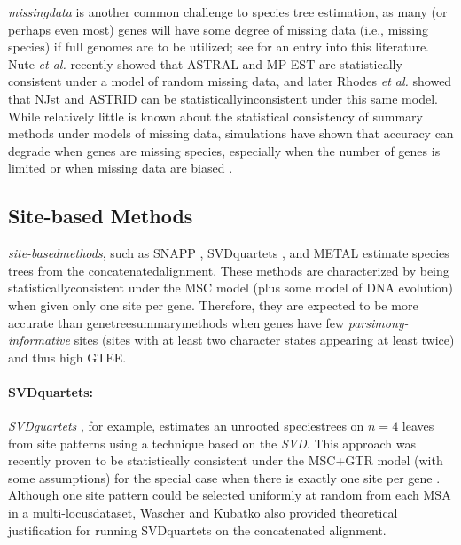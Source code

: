 \textit{\Gls{missingdata}} is another common challenge to species tree estimation, as many (or perhaps even most) \glspl{gene} will have some degree of missing data (i.e., missing species) if full genomes are to be utilized; see \cite{driskell2004prospects, streicher2016how, xi2016impact} for an entry into this literature.
Nute {\em et al.} \cite{nute2018performance} recently showed that ASTRAL and MP-EST are statistically consistent under a model of random missing data, and later Rhodes {\em et al.} \cite{rhodes2020njst} showed that NJst and ASTRID can be \gls{statisticallyinconsistent} under this same model.
While relatively little is known about the statistical consistency of summary methods under models of missing data, simulations have shown that accuracy can degrade when genes are missing species, especially when the number of genes is limited  \cite{vachaspati2015astrid, hovmoller2013effects, xi2016impact} or when missing data are biased \cite{xi2016impact}. 

\subsection{Site-based Methods}
\textit{\Glspl{site-basedmethod}}, such as SNAPP \cite{bryant2012inferring-snapp}, SVDquartets \cite{chifman2014quartet-svdquartets, chifman2015identifiability}, and METAL \cite{dasarathy2015data-metal} 
estimate species trees from the \gls{concatenatedalignment}.
These methods are characterized by being \gls{statisticallyconsistent} under the \gls{MSC} model (plus some model of DNA evolution) when given only one site per gene.
Therefore, they are expected to be more accurate than \glspl{genetreesummarymethod} when \glspl{gene} have few \textit{\gls{parsimony-informative}} \glspl{site} (sites with at least two character states appearing at least twice) and thus high \gls{GTEE}. 

\paragraph{SVDquartets:}
\textit{\gls{SVDquartets}} \cite{chifman2014quartet-svdquartets, chifman2015identifiability}, for example, estimates an \gls{unrooted} \glspl{speciestree} on $n=4$ leaves from site patterns using a technique based on the \textit{\gls{SVD}}.
This approach was recently proven to be statistically consistent under the \gls{MSC+GTR} model (with some assumptions) for the special case when there is exactly one site per gene \cite{wascher2015consistency}.
Although one site pattern could be selected uniformly at random from each MSA in a \gls{multi-locusdataset}, Wascher and Kubatko \cite{wascher2015consistency} also provided theoretical justification for running SVDquartets on the concatenated alignment.

